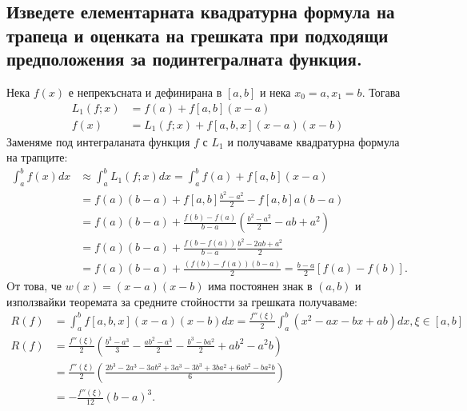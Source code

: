\documentclass[12pt]{article}
\numberwithin{equation}{subsection}
\numberwithin{theorem}{subsection}
\numberwithin{definition}{subsection}
\numberwithin{corollary}{subsection}
\begin{document}
\subsection{Изведете елементарната квадратурна формула на трапеца и оценката на грешката при подходящи предположения за подинтегралната функция.}
  Нека $f(x)$ е непрекъсната и дефинирана в $[a,b]$ и нека $x_0=a,x_1=b$. Тогава
  \begin{align*}
    L_1(f;x)&=f(a)+f[a,b](x-a)\\
    f(x)&=L_1(f;x)+f[a,b,x](x-a)(x-b)
  \end{align*}
  Заменяме под интеграланата функция $f$ с $L_1$ и получаваме квадратурна формула на трапците:
  \begin{align*}\label{trap}
  \int_a^bf(x)dx&\approx\int_a^bL_1(f;x)dx=\int_a^bf(a)+f[a,b](x-a) \\
    &=f(a)(b-a)+f[a,b]\frac{b^2-a^2}{2}-f[a,b]a(b-a) \\
    &= f(a)(b-a) + \frac{f(b)-f(a)}{b-a}\left(\frac{b^2-a^2}{2} -ab +a^2\right)\\
    &=f(a)(b-a) + \frac{f(b-f(a))}{b-a}\frac{b^2-2ab+a^2}{2}\\
    &=f(a)(b-a)+\frac{(f(b)-f(a))(b-a)}{2}=\boxed{\frac{b-a}{2}[f(a)-f(b)].}
  \end{align*}
  Oт това, че $w(x) = (x-a)(x-b)$ има постоянен знак в $(a,b)$ и използвайки теоремата за средните стойностти за грешката получаваме:
  \begin{align*}
    R(f) &= \int_a^bf[a,b,x](x-a)(x-b)dx=\frac{f''(\xi)}{2}\int_a^b(x^2-ax-bx+ab)dx, \xi\in[a,b]\\
    R(f) &= \frac{f''(\xi)}{2}\left(\frac{b^3-a^3}{3}-\frac{ab^2-a^3}{2}-\frac{b^3-ba^2}{2}+ab^2-a^2b\right)\\
         &= \frac{f''(\xi)}{2}\left(\frac{2b^3-2a^3-3ab^2+3a^3-3b^3+3ba^2+6ab^2-ba^2b}{6}\right)\\
         &= \boxed{-\frac{f''(\xi)}{12}(b-a)^3}.
  \end{align*}
\end{document}
